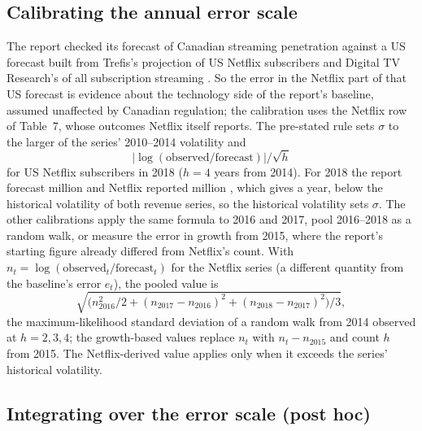 \subsection*{Calibrating the annual error scale}
The report checked its forecast of Canadian streaming penetration against a US forecast built from Trefis's projection of US Netflix subscribers and Digital TV Research's of all subscription streaming \citep[paras.~135--137, pp.~50--51]{nordicity2015television}. So the error in the Netflix part of that US forecast is evidence about the technology side of the report's baseline, assumed unaffected by Canadian regulation; the calibration uses the Netflix row of Table~7, whose outcomes Netflix itself reports. The pre-stated rule sets \(\sigma\) to the larger of the series' 2010--2014 volatility and
\[
|\log(\text{observed}/\text{forecast})|/\sqrt{h}
\]
for US Netflix subscribers in 2018 (\(h=4\) years from 2014). For 2018 the report forecast \lttvNetflixFcEighteen{} million and Netflix reported \lttvNetflixObsEighteen{} million \citep{netflix2019form10k}, which gives \lttvSigmaTech{} a year, below the historical volatility of both revenue series, so the historical volatility sets \(\sigma\). The other calibrations apply the same formula to 2016 and 2017, pool 2016--2018 as a random walk, or measure the error in growth from 2015, where the report's starting figure already differed from Netflix's count. With \(n_t=\log(\text{observed}_t/\text{forecast}_t)\) for the Netflix series (a different quantity from the baseline's error \(e_t\)), the pooled value is
\[
\sqrt{\bigl(n_{2016}^2/2+(n_{2017}-n_{2016})^2+(n_{2018}-n_{2017})^2\bigr)/3},
\]
the maximum-likelihood standard deviation of a random walk from 2014 observed at \(h=2,3,4\); the growth-based values replace \(n_t\) with \(n_t-n_{2015}\) and count \(h\) from 2015. The Netflix-derived value applies only when it exceeds the series' historical volatility.

\subsection*{Integrating over the error scale (post hoc)}

